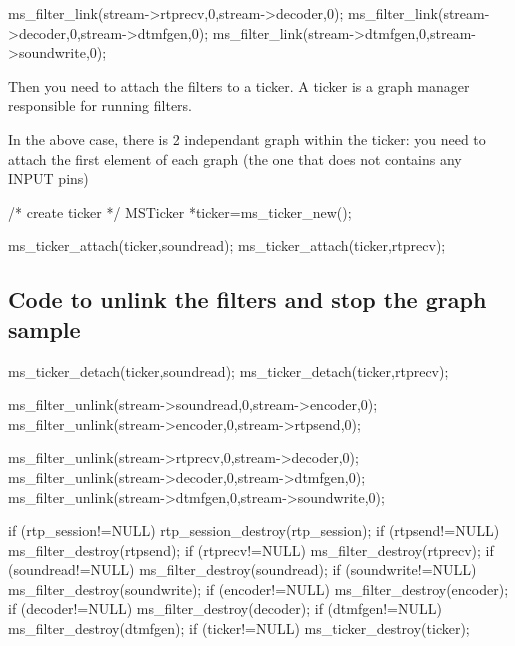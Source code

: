 \begin{DoxyPre}        ms\_filter\_link(stream->rtprecv,0,stream->decoder,0);
        ms\_filter\_link(stream->decoder,0,stream->dtmfgen,0);
        ms\_filter\_link(stream->dtmfgen,0,stream->soundwrite,0); 
\end{DoxyPre}


Then you need to \textquotesingle{}attach\textquotesingle{} the filters to a ticker. A ticker is a graph manager responsible for running filters.

In the above case, there is 2 independant graph within the ticker\+: you need to attach the first element of each graph (the one that does not contains any I\+N\+P\+UT pins)


\begin{DoxyPre}
        /* create ticker */
        MSTicker *ticker=ms\_ticker\_new();\end{DoxyPre}



\begin{DoxyPre}        ms\_ticker\_attach(ticker,soundread);
        ms\_ticker\_attach(ticker,rtprecv);
\end{DoxyPre}


\subsection*{Code to unlink the filters and stop the graph sample}


\begin{DoxyPre}
        ms\_ticker\_detach(ticker,soundread);
        ms\_ticker\_detach(ticker,rtprecv);\end{DoxyPre}



\begin{DoxyPre}        ms\_filter\_unlink(stream->soundread,0,stream->encoder,0);
        ms\_filter\_unlink(stream->encoder,0,stream->rtpsend,0);\end{DoxyPre}



\begin{DoxyPre}        ms\_filter\_unlink(stream->rtprecv,0,stream->decoder,0);
        ms\_filter\_unlink(stream->decoder,0,stream->dtmfgen,0);
        ms\_filter\_unlink(stream->dtmfgen,0,stream->soundwrite,0);\end{DoxyPre}



\begin{DoxyPre}        if (rtp\_session!=NULL) rtp\_session\_destroy(rtp\_session);
        if (rtpsend!=NULL) ms\_filter\_destroy(rtpsend);
        if (rtprecv!=NULL) ms\_filter\_destroy(rtprecv);
        if (soundread!=NULL) ms\_filter\_destroy(soundread);
        if (soundwrite!=NULL) ms\_filter\_destroy(soundwrite);
        if (encoder!=NULL) ms\_filter\_destroy(encoder);
        if (decoder!=NULL) ms\_filter\_destroy(decoder);
        if (dtmfgen!=NULL) ms\_filter\_destroy(dtmfgen);
        if (ticker!=NULL) ms\_ticker\_destroy(ticker);
\end{DoxyPre}
 